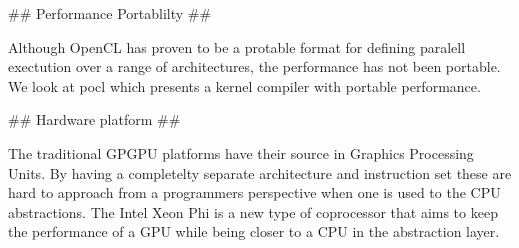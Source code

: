 \begin{markdown}
## Performance Portablilty ##

Although OpenCL has proven to be a protable format for defining
paralell exectution over a range of architectures, the performance has
not been portable. We look at pocl \cite{pocl} which presents a kernel
compiler with portable performance.

## Hardware platform ##

The traditional GPGPU platforms have their source in Graphics
Processing Units. By having a completelty separate architecture and
instruction set these are hard to approach from a programmers
perspective when one is used to the CPU abstractions. The Intel Xeon
Phi \cite{phi} is a new type of coprocessor that aims to keep the
performance of a GPU while being closer to a CPU in the abstraction layer.




\end{markdown}


